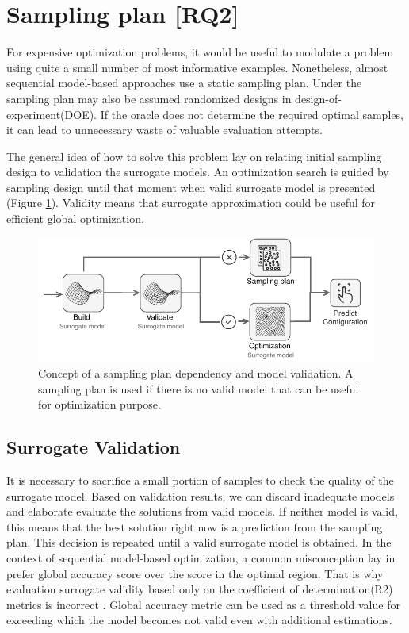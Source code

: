     \section{Sampling plan [RQ2]}
        For expensive optimization problems, it would be useful to modulate a problem using quite a small number of most informative examples. Nonetheless, almost sequential model-based approaches use a static sampling plan. Under the sampling plan may also be assumed randomized designs in design-of-experiment(DOE). If the oracle does not determine the required optimal samples, it can lead to unnecessary waste of valuable evaluation attempts. 
        
        The general idea of how to solve this problem lay on relating initial sampling design to validation the surrogate models. An optimization search is guided by sampling design until that moment when valid surrogate model is presented (Figure \ref{fig:concept_sampling}). Validity means that surrogate approximation could be useful for efficient global optimization.

            \begin{figure}
                \centering
                \includegraphics[width=\textwidth]{content/images/dinamic_sampling_plan}
                \caption[Non-dominated points]{Concept of a sampling plan dependency and model validation. A sampling plan is used if there is no valid model that can be useful for optimization purpose.} 
                \label{fig:concept_sampling} 
            \end{figure}      

        \subsection{Surrogate Validation}
        It is necessary to sacrifice a small portion of samples to check the quality of the surrogate model. Based on validation results, we can discard inadequate models and elaborate evaluate the solutions from valid models. If neither model is valid, this means that the best solution right now is a prediction from the sampling plan. This decision is repeated until a valid surrogate model is obtained.
        In the context of sequential model-based optimization, a common misconception lay in prefer global accuracy score over the score in the optimal region. That is why evaluation surrogate validity based only on the coefficient of determination(R2) metrics is incorrect \cite{nardi2019practical}. Global accuracy metric can be used as a threshold value for exceeding which the model becomes not valid even with additional estimations.  

